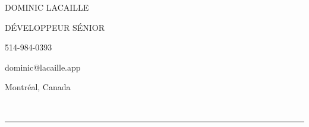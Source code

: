 \documentclass{article}
\begin{document}

\thispagestyle{empty}

\noindent
\begin{minipage}{12cm}
  \vspace{0.5em}
  {\fontsize{33}{33}\noindent\selectfont\uppercase{Dominic Lacaille}\par}
  \vspace{1em}
  {\noindent\large\trackingwide\uppercase{Développeur Sénior}\par}
\end{minipage}
\hfill
\begin{minipage}{4cm}
  {\faPhone*\hspace{1.5em}514-984-0393\par}
  \vspace{0.5em}
  {\faEnvelope\hspace{1.5em}dominic@lacaille.app\par}
  \vspace{0.5em}
  {\faCanadianMapleLeaf\hspace{1.5em}Montréal, Canada\par}
\end{minipage}

\

\par\noindent\rule{\textwidth}{0.4pt}

\vspace{3em}
\end{document}
